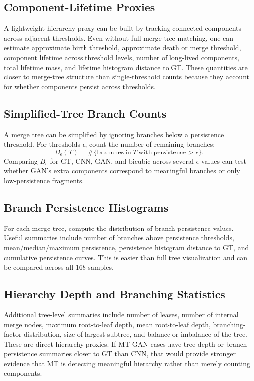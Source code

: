 \documentclass[conference]{IEEEtran}
\begin{document}
\subsection{Component-Lifetime Proxies}

A lightweight hierarchy proxy can be built by tracking connected components across adjacent thresholds. Even without full merge-tree matching, one can estimate approximate birth threshold, approximate death or merge threshold, component lifetime across threshold levels, number of long-lived components, total lifetime mass, and lifetime histogram distance to GT. These quantities are closer to merge-tree structure than single-threshold counts because they account for whether components persist across thresholds.

\subsection{Simplified-Tree Branch Counts}

A merge tree can be simplified by ignoring branches below a persistence threshold. For thresholds $\epsilon$, count the number of remaining branches:
\begin{equation}
    B_{\epsilon}(T) = \#\{\mathrm{branches\ in\ }T\mathrm{\ with\ persistence}>\epsilon\}.
\end{equation}
Comparing $B_{\epsilon}$ for GT, CNN, GAN, and bicubic across several $\epsilon$ values can test whether GAN's extra components correspond to meaningful branches or only low-persistence fragments.

\subsection{Branch Persistence Histograms}

For each merge tree, compute the distribution of branch persistence values. Useful summaries include number of branches above persistence thresholds, mean/median/maximum persistence, persistence histogram distance to GT, and cumulative persistence curves. This is easier than full tree visualization and can be compared across all 168 samples.

\subsection{Hierarchy Depth and Branching Statistics}

Additional tree-level summaries include number of leaves, number of internal merge nodes, maximum root-to-leaf depth, mean root-to-leaf depth, branching-factor distribution, size of largest subtree, and balance or imbalance of the tree. These are direct hierarchy proxies. If MT-GAN cases have tree-depth or branch-persistence summaries closer to GT than CNN, that would provide stronger evidence that MT is detecting meaningful hierarchy rather than merely counting components.
\end{document}
